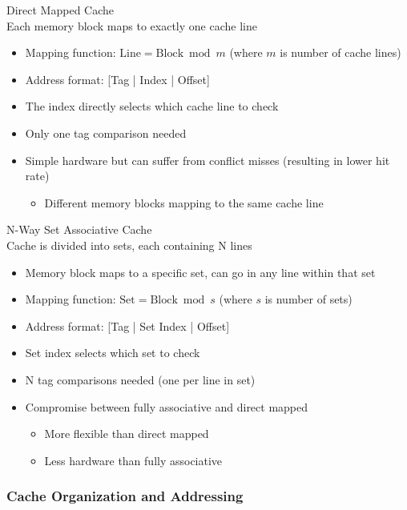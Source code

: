 \begin{concept}{Direct Mapped Cache}\\
    Each memory block maps to exactly one cache line
\begin{itemize}
    \item Mapping function: $\text{Line} = \text{Block} \bmod m$ (where $m$ is number of cache lines)
    \item Address format: [Tag | Index | Offset]
    \item The index directly selects which cache line to check
    \item Only one tag comparison needed
    \item Simple hardware but can suffer from conflict misses (resulting in lower hit rate)
    \begin{itemize}
        \item Different memory blocks mapping to the same cache line
    \end{itemize}
\end{itemize}
\end{concept}

\begin{concept}{N-Way Set Associative Cache}\\
    Cache is divided into sets, each containing N lines
\begin{itemize}
    \item Memory block maps to a specific set, can go in any line within that set
    \item Mapping function: $\text{Set} = \text{Block} \bmod s$ (where $s$ is number of sets)
    \item Address format: [Tag | Set Index | Offset]
    \item Set index selects which set to check
    \item N tag comparisons needed (one per line in set)
    \item Compromise between fully associative and direct mapped 
    \begin{itemize}
        \item More flexible than direct mapped
        \item Less hardware than fully associative
    \end{itemize}
\end{itemize}
\end{concept}

\multend 

\subsubsection{Cache Organization and Addressing}

